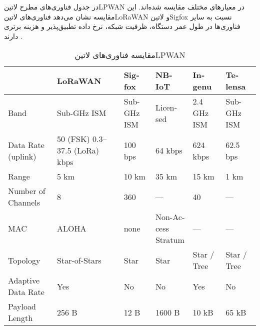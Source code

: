 در جدول  فناوری‌های مطرح ‌لاتین{LPWAN} در معیارهای مختلف مقایسه شده‌اند. این مقایسه نشان می‌دهد فناوری‌های ‌لاتین{LoRaWAN}
و ‌لاتین{Sigfox} نسبت به سایر فناوری‌ها در طول عمر دستگاه، ظرفیت شبکه، نرخ داده تطبیق‌پذیر و هزینه برتری دارند .

\begin{table}
\caption{مقایسه فناوری‌های ‌لاتین{LPWAN}    }
\label{جدول: مقایسه فناوری‌های LPWAN}
\begin{latin}\begin{tabularx}
  {\textwidth}
  {|*{6}{X|}}
  \toprule

  &
  LoRaWAN &
  Sigfox &
  NB-IoT &
  Ingenu &
  Telensa \\

  \midrule

  Band &
  Sub-GHz ISM &
  Sub-GHz ISM &
  Licensed &
  2.4 GHz ISM &
  Sub-GHz ISM \\

  \midrule

  Data Rate (uplink) &
  50 (FSK) 0.3--37.5 (LoRa) kbps &
  100 bps &
  64 kbps &
  624 kbps &
  62.5 bps \\

  \midrule

  Range &
  5 km &
  10 km &
  35 km &
  15 km &
  1 km \\

  \midrule

  Number of Channels &
  8 &
  360 &
  --- &
  40 &
  --- \\

  \midrule

  MAC &
  ALOHA &
  none &
  Non-Access Stratum &
  --- &
  --- \\

  \midrule

  Topology &
  Star-of-Stars &
  Star &
  Star &
  Star / Tree &
  Star / Tree \\

  \midrule

  Adaptive Data Rate &
  Yes &
  No &
  No &
  Yes &
  No \\

  \midrule

  Payload Length &
  256 B &
  12 B &
  1600 B &
  10 kB &
  65 kB \\

  \midrule


\end{tabularx}
\end{latin}
\end{table}
